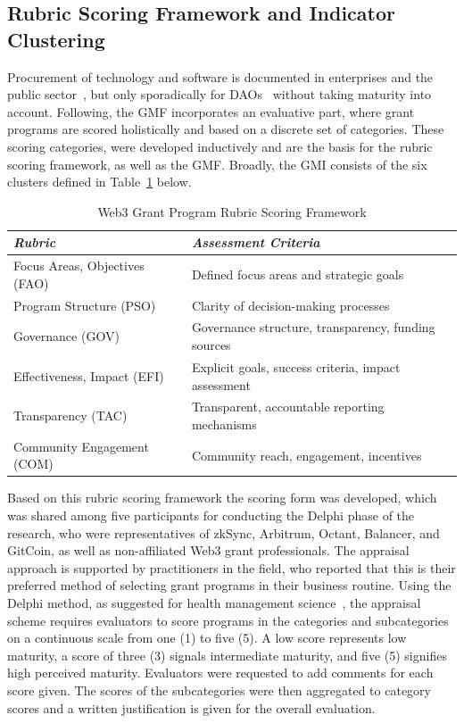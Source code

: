 \documentclass[conference]{IEEEtran}
\begin{document}
\subsection{Rubric Scoring Framework and Indicator Clustering}\label{sec_3.1}

Procurement of technology and software is documented in enterprises and the public sector~\cite{bartle_review_2003,johansson_roadmap_2019,uyarra_barriers_2014}, but only sporadically for DAOs~\cite{monteiro_decentralised_2023} without taking maturity into account. Following, the GMF incorporates an evaluative part, where grant programs are scored holistically and based on a discrete set of categories. These scoring categories, were developed inductively and are the basis for the rubric scoring framework, as well as the GMF. Broadly, the GMI consists of the six clusters defined in Table~\ref{tab:grant_rubric} below.


\begin{table}[htbp]
\caption{Web3 Grant Program Rubric Scoring Framework}
\begin{center}
\footnotesize
\begin{tabular}{p{3.8cm}p{4.5cm}}
\hline
\textbf{\textit{Rubric}} & \textbf{\textit{Assessment Criteria}} \\
\hline
Focus Areas, Objectives (FAO) & Defined focus areas and strategic goals \\
\hline
Program Structure (PSO) & Clarity of decision-making processes \\
\hline
Governance (GOV) & Governance structure, transparency, funding sources \\
\hline
Effectiveness, Impact (EFI) & Explicit goals, success criteria, impact assessment \\
\hline
Transparency (TAC) & Transparent, accountable reporting mechanisms \\
\hline
Community Engagement (COM) & Community reach, engagement, incentives \\
\hline
\end{tabular}
\end{center}
\label{tab:grant_rubric}
\end{table}

Based on this rubric scoring framework the scoring form was developed, which was shared among five participants for conducting the Delphi phase of the research, who were representatives of zkSync, Arbitrum, Octant, Balancer, and GitCoin, as well as non-affiliated Web3 grant professionals. The appraisal approach is supported by practitioners in the field, who reported that this is their preferred method of selecting grant programs in their business routine. Using the Delphi method, as suggested for health management science~\cite{van_ede_assembling_2024}, the appraisal scheme requires evaluators to score programs in the categories and subcategories on a continuous scale from one (1) to five (5). A low score represents low maturity, a score of three (3) signals intermediate maturity, and five (5) signifies high perceived maturity. Evaluators were requested to add comments for each score given. The scores of the subcategories were then aggregated to category scores and a written justification is given for the overall evaluation.
\end{document}
